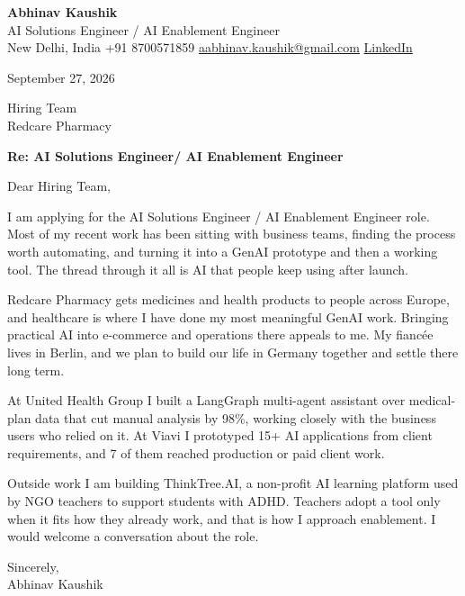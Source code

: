 \documentclass[11pt,a4paper]{article}
\begin{document}
{\Large\bfseries Abhinav Kaushik}\\
AI Solutions Engineer / AI Enablement Engineer\\
New Delhi, India \textbar{} +91 8700571859 \textbar{} \href{mailto:aabhinav.kaushik@gmail.com}{aabhinav.kaushik@gmail.com} \textbar{} \href{https://www.linkedin.com/in/abhinav-kaushik10/}{LinkedIn}  

September 27, 2026

Hiring Team\\
Redcare Pharmacy

\textbf{Re: AI Solutions Engineer/ AI Enablement Engineer}

Dear Hiring Team,

I am applying for the AI Solutions Engineer / AI Enablement Engineer role. Most of my recent work has been sitting with business teams, finding the process worth automating, and turning it into a GenAI prototype and then a working tool. The thread through it all is AI that people keep using after launch.

Redcare Pharmacy gets medicines and health products to people across Europe, and healthcare is where I have done my most meaningful GenAI work. Bringing practical AI into e-commerce and operations there appeals to me. My fiancée lives in Berlin, and we plan to build our life in Germany together and settle there long term.

At United Health Group I built a LangGraph multi-agent assistant over medical-plan data that cut manual analysis by 98\%, working closely with the business users who relied on it. At Viavi I prototyped 15+ AI applications from client requirements, and 7 of them reached production or paid client work.

Outside work I am building ThinkTree.AI, a non-profit AI learning platform used by NGO teachers to support students with ADHD. Teachers adopt a tool only when it fits how they already work, and that is how I approach enablement. I would welcome a conversation about the role.

Sincerely,\\[4pt]
Abhinav Kaushik
\end{document}
